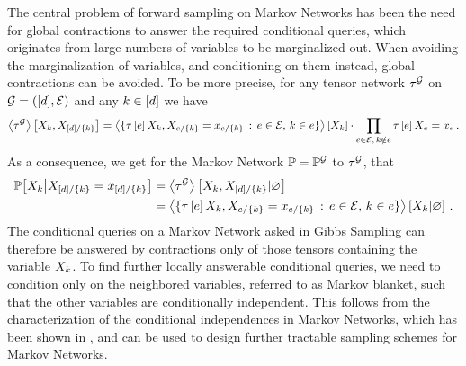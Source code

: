 The central problem of forward sampling on Markov Networks has been the need for global contractions to answer the required conditional queries, which originates from large numbers of variables to be marginalized out.
When avoiding the marginalization of variables, and conditioning on them instead, global contractions can be avoided.
To be more precise, for any tensor network $\tau^{\mathcal{G}}$ on $\mathcal{G}=([d],\mathcal{E})$ and any $k\in[d]$ we have
\begin{align*}
    \left\langle \tau^{\mathcal{G}}\right\rangle \left[ X_{k},X_{[d]/\{k\}} \right]
    = \left\langle \{\tau\left[e\right]{X_{k},X_{e/\{k\}}=x_{e/\{k\}}} \, : \, e\in\mathcal{E}, \, k\in e\}\right\rangle \left[ X_{k} \right]
    \cdot \prod_{e\in\mathcal{E}, \, k\notin e} \tau\left[e\right]{X_{e}=x_{e}} \, .
\end{align*}
As a consequence, we get for the Markov Network $\mathbb{P}=\mathbb{P}^{\mathcal{G}}$ to $\tau^{\mathcal{G}}$, that
\begin{align*}
    \mathbb{P}\big[X_{k}\big|X_{[d]/\{k\}}=x_{[d]/\{k\}}\big]
    &= \left\langle \tau^{\mathcal{G}}\right\rangle \left[ X_{k},X_{[d]/\{k\}} | \varnothing \right] \\
    &= \left\langle \{\tau\left[e\right]{X_{k},X_{e/\{k\}}=x_{e/\{k\}}} \, : \, e\in\mathcal{E}, \, k\in e\}\right\rangle \left[ X_{k} | \varnothing \right] \, .
\end{align*}
The conditional queries on a Markov Network asked in Gibbs Sampling can therefore be answered by contractions only of those tensors containing the variable $X_{k}$.
To find further locally answerable conditional queries, we need to condition only on the neighbored variables, referred to as Markov blanket, such that the other variables are conditionally independent.
This follows from the characterization of the conditional independences in Markov Networks, which has been shown in , and can be used to design further tractable sampling schemes for Markov Networks.


